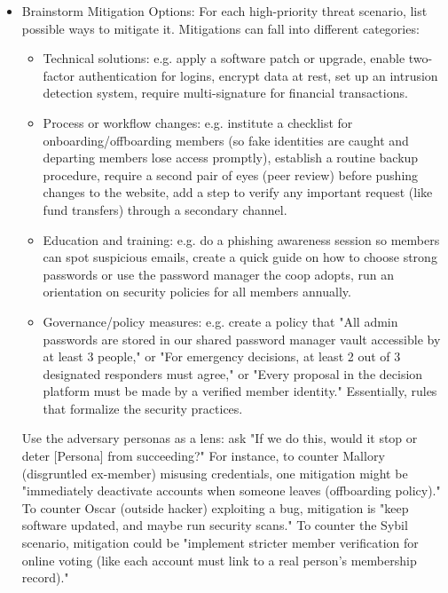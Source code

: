 \begin{itemize}   

    \item Brainstorm Mitigation Options: For each high-priority threat scenario, list possible ways to mitigate
    it. Mitigations can fall into different categories:
        \begin{itemize}   
            \item Technical solutions: e.g. apply a software patch or upgrade, enable two-factor authentication
    for logins, encrypt data at rest, set up an intrusion detection system, require multi-signature for financial
    transactions.
            \item Process or workflow changes: e.g. institute a checklist for onboarding/offboarding members (so
    fake identities are caught and departing members lose access promptly), establish a routine backup procedure,
    require a second pair of eyes (peer review) before pushing changes to the website, add a step to verify any
    important request (like fund transfers) through a secondary channel.
            \item Education and training: e.g. do a phishing awareness session so members can spot suspicious
    emails, create a quick guide on how to choose strong passwords or use the password manager the coop adopts,
    run an orientation on security policies for all members annually.
            \item Governance/policy measures: e.g. create a policy that "All admin passwords are stored in our
    shared password manager vault accessible by at least 3 people," or "For emergency decisions, at least 2 out of
    3 designated responders must agree," or "Every proposal in the decision platform must be made by a verified
    member identity." Essentially, rules that formalize the security practices.
        \end{itemize}
    
    Use the adversary personas as a lens: ask "If we do this, would it stop or deter [Persona] from succeeding?"
    For instance, to counter Mallory (disgruntled ex-member) misusing credentials, one mitigation might be
    "immediately deactivate accounts when someone leaves (offboarding policy)." To counter Oscar (outside hacker)
    exploiting a bug, mitigation is "keep software updated, and maybe run security scans." To counter the Sybil
    scenario, mitigation could be "implement stricter member verification for online voting (like each account
    must link to a real person's membership record)."


\end{itemize}
